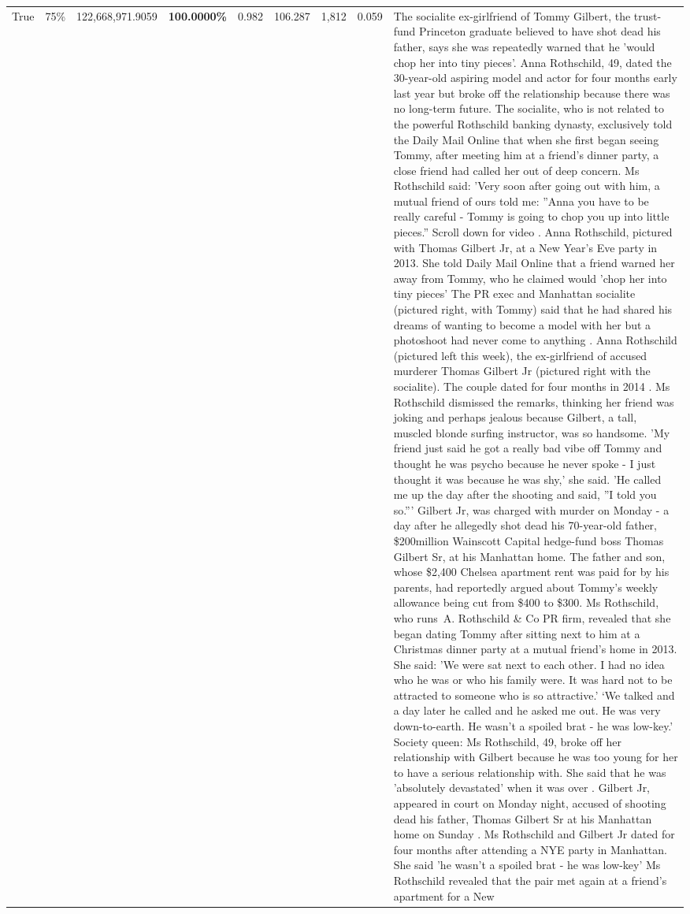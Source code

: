 \begin{table}[H]
\begin{tabular}{lllrlllll}
True & 75\% & 122,668,971.9059 & \bfseries \color{red} 100.0000\% & 0.982 & 106.287 & 1,812 & 0.059 & The socialite ex-girlfriend of Tommy Gilbert, the trust-fund Princeton graduate believed to have shot dead his father, says she was repeatedly warned that he 'would chop her into tiny pieces'. Anna Rothschild, 49, dated the 30-year-old aspiring model and actor for four months early last year but broke off the relationship because there was no long-term future. The socialite, who is not related to the powerful Rothschild banking dynasty, exclusively told the Daily Mail Online that when she first began seeing Tommy, after meeting him at a friend's dinner party, a close friend had called her out of deep concern. Ms Rothschild said: 'Very soon after going out with him, a mutual friend of ours told me: ''Anna you have to be really careful - Tommy is going to chop you up into little pieces.'' Scroll down for video . Anna Rothschild, pictured with Thomas Gilbert Jr, at a New Year's Eve party in 2013. She told Daily Mail Online that a friend warned her away from Tommy, who he claimed would 'chop her into tiny pieces' The PR exec and Manhattan socialite (pictured right, with Tommy) said that he had shared his dreams of wanting to become a model with her but a photoshoot had never come to anything . Anna Rothschild (pictured left this week), the ex-girlfriend of accused murderer Thomas Gilbert Jr (pictured right with the socialite). The couple dated for four months in 2014 . Ms Rothschild dismissed the remarks, thinking her friend was joking and perhaps jealous because Gilbert, a tall, muscled blonde surfing instructor, was so handsome. 'My friend just said he got a really bad vibe off Tommy and thought he was psycho because he never spoke - I just thought it was because he was shy,' she said. 'He called me up the day after the shooting and said, ''I told you so.''' Gilbert Jr, was charged with murder on Monday - a day after he allegedly shot dead his 70-year-old father, \$200million Wainscott Capital hedge-fund boss Thomas Gilbert Sr, at his Manhattan home. The father and son, whose \$2,400 Chelsea apartment rent was paid for by his parents, had reportedly argued about Tommy's weekly allowance being cut from \$400 to \$300. Ms Rothschild, who runs A. Rothschild \& Co PR firm, revealed that she began dating Tommy after sitting next to him at a Christmas dinner party at a mutual friend's home in 2013. She said: 'We were sat next to each other. I had no idea who he was or who his family were. It was hard not to be attracted to someone who is so attractive.' ‘We talked and a day later he called and he asked me out. He was very down-to-earth. He wasn’t a spoiled brat - he was low-key.’ Society queen: Ms Rothschild, 49, broke off her relationship with Gilbert because he was too young for her to have a serious relationship with. She said that he was 'absolutely devastated' when it was over . Gilbert Jr, appeared in court on Monday night, accused of shooting dead his father, Thomas Gilbert Sr at his Manhattan home on Sunday . Ms Rothschild and Gilbert Jr dated for four months after attending a NYE party in Manhattan. She said 'he wasn't a spoiled brat - he was low-key' Ms Rothschild revealed that the pair met again at a friend’s apartment for a New 
\end{tabular}
\end{table}
